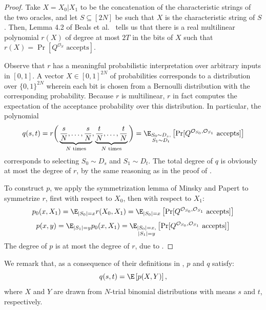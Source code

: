 \begin{proof}
Take $X = X_0|X_1$ to be the concatenation of the characteristic strings of the two oracles, and let $S \subseteq [2N]$ be such that $X$ is the characteristic string of $S$. Then, Lemma 4.2 of Beals et al.\ \cite{bbcmw} tells us that there is a real multilinear polynomial $r(X)$ of degree at most $2T$ in the bits of $X$ such that $r(X) = \Pr[ Q^{\mathcal{O}_S} \text{ accepts}]$.

Observe that $r$ has a meaningful probabilistic interpretation over arbitrary inputs in $[0, 1]$. A vector $X \in [0, 1]^{2N}$ of probabilities corresponds to a distribution over $\{0,1\}^{2N}$ wherein each bit is chosen from a Bernoulli distribution with the corresponding probability. Because $r$ is multilinear, $r$ in fact computes the expectation of the acceptance probability over this distribution. In particular, the polynomial
\begin{equation}
q(s, t) = r\bigg(\underbrace{\frac{s}{N},\ldots,\frac{s}{N}}_{N \text{ times}}, \underbrace{\frac{t}{N},\ldots,\frac{t}{N}}_{N \text{ times}}\bigg) = \E_{\substack{S_0 \sim D_s,\\S_1 \sim D_t}}\left[\Pr[ Q^{\mathcal{O}_{S_0},\mathcal{O}_{S_1}} \text{ accepts}] \right]    
\end{equation}
corresponds to selecting $S_0 \sim D_s$ and $S_1 \sim D_t$. The total degree of $q$ is obviously
at most the degree of $r$, by the same reasoning as in the proof of .

To construct $p$, we apply the symmetrization lemma of Minsky and Papert \cite{mp} to symmetrize $r$, first with respect to $X_0$, then with respect to $X_1$:
\begin{equation}
    p_0(x, X_1) = \E_{|S_0|=x} r(X_0,X_1) =  \E_{|S_0|=x}\left[\Pr[ Q^{\mathcal{O}_{S_0},\mathcal{O}_{S_1}} \text{ accepts}] \right]
\end{equation}
\begin{equation}
    p(x, y) = \E_{|S_1|=y} p_0(x,X_1) = \E_{\substack{|S_0|=x,\\|S_1|=y}}\left[\Pr[ Q^{\mathcal{O}_{S_0},\mathcal{O}_{S_1}} \text{ accepts}] \right] 
\end{equation}  
The degree of $p$ is at most the degree of $r$, due to .
\end{proof}


We remark that, as a consequence of their definitions in , $p$ and $q$ satisfy:
\begin{equation}
q(s, t) = \E \left[ p(X, Y) \right],
\end{equation}
where $X$ and $Y$ are drawn from $N$-trial binomial distributions with means $s$ and $t$, respectively.

